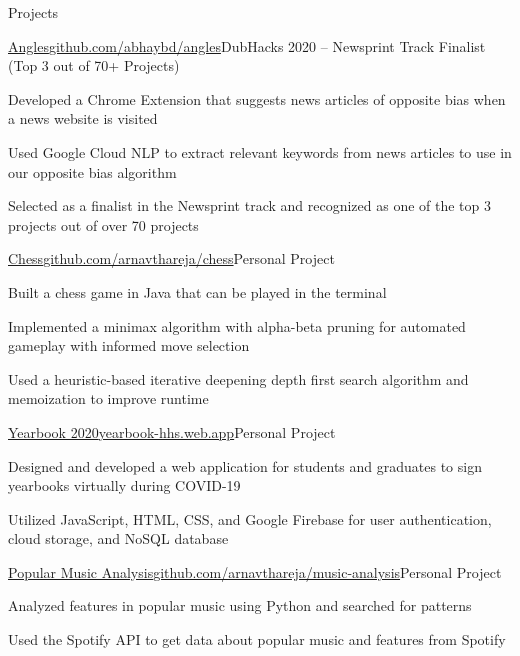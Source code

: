 \documentclass{resume} %
\begin{document}
\begin{rSection}{Projects}

\begin{project}{\href{https://github.com/abhaybd/angles}{Angles}}{\href{https://github.com/abhaybd/angles}{github.com/abhaybd/angles}}{DubHacks 2020 – Newsprint Track Finalist (Top 3 out of 70+ Projects)}
\item Developed a Chrome Extension that suggests news articles of opposite bias when a news website is visited
\item Used Google Cloud NLP to extract relevant keywords from news articles to use in our opposite bias algorithm
\item Selected as a finalist in the Newsprint track and recognized as one of the top 3 projects out of over 70 projects
\end{project}

\begin{project}{\href{https://github.com/arnavthareja/chess}{Chess}}{\href{https://github.com/arnavthareja/chess}{github.com/arnavthareja/chess}}{Personal Project}
\item Built a chess game in Java that can be played in the terminal
\item Implemented a minimax algorithm with alpha-beta pruning for automated gameplay with informed move selection
\item Used a heuristic-based iterative deepening depth first search algorithm and memoization to improve runtime
\end{project}

\begin{project}{\href{https://yearbook-hhs.web.app/}{Yearbook 2020}}{\href{https://yearbook-hhs.web.app/}{yearbook-hhs.web.app}}{Personal Project}
\item Designed and developed a web application for students and graduates to sign yearbooks virtually during COVID-19
\item Utilized JavaScript, HTML, CSS, and Google Firebase for user authentication, cloud storage, and NoSQL database
\end{project}

\begin{project}{\href{https://github.com/arnavthareja/music-analysis}{Popular Music Analysis}}{\href{https://github.com/arnavthareja/music-analysis}{github.com/arnavthareja/music-analysis}}{Personal Project}
\item Analyzed features in popular music using Python and searched for patterns
\item Used the Spotify API to get data about popular music and features from Spotify
\end{project}

\end{rSection}
\end{document}
